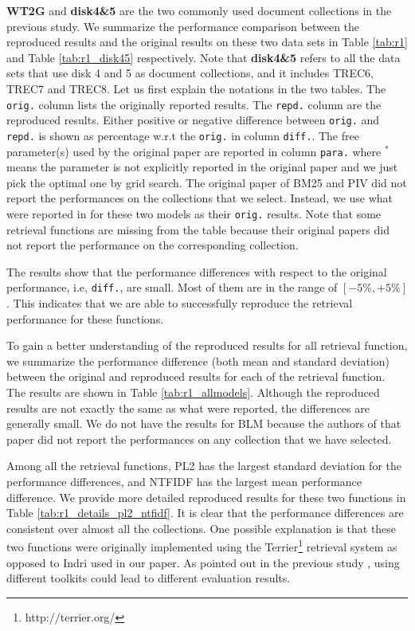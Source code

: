 \textbf{WT2G} and \textbf{disk4\&5} are the two commonly used document 
collections in the previous study.  We summarize the performance comparison 
between the reproduced results and the original results on these 
two data sets in Table \ref{tab:r1} and Table \ref{tab:r1_disk45} 
respectively. Note that \textbf{disk4\&5} refers to all the data sets 
that use disk 4 and 5 as document collections, and it includes 
TREC6, TREC7 and TREC8.  Let us first explain the notations in the 
two tables.  
The \verb|orig.| column lists the originally reported results. 
The \verb|repd.| column are the reproduced results. 
Either positive or negative difference between \verb|orig.| and 
\verb|repd.| is shown as percentage w.r.t the \verb|orig.| in column 
\verb|diff.|. 
The free parameter(s) used by the original paper are 
reported in column \verb|para.| where $^*$ means the parameter is not 
explicitly reported in the original paper and we just pick the optimal 
one by grid search. 
The original paper of BM25 and PIV did not report the performances 
on the collections that we select. Instead, we use what were 
reported in \cite{He:2005:SDP:1076034.1076114,Lv:2011:LTF:2063576.2063584} for 
these two models as their \verb|orig.| results.  Note that some retrieval 
functions are missing from the table because their original papers 
did not report the performance on the corresponding collection. 

The results show that the performance differences with respect to the 
original performance, i.e, 
\verb|diff.|, are small.  Most of them are in the range of $[-5\%, +5\%]$. 
This indicates that we are able to successfully reproduce the retrieval 
performance for these functions. 



To gain a better understanding of the reproduced results for 
all retrieval function, we summarize the performance difference
(both mean and standard deviation) between the original 
and reproduced results for each of the retrieval function. 
The results are shown in Table \ref{tab:r1_allmodels}.  
Although the reproduced results are not 
exactly the same as what were reported, the differences are 
generally small. 
We do not have the results for BLM because the authors of that paper 
did not report the performances on any collection that 
we have selected.  

Among all the retrieval functions, PL2 has the largest standard 
deviation for the performance differences, and NTFIDF has the 
largest mean performance difference. We provide more detailed
reproduced results for these two functions in Table \ref{tab:r1_details_pl2_ntfidf}. 
It is clear that the performance differences are consistent over
almost all the collections.  One possible explanation is that 
these two functions were originally implemented using the 
Terrier\footnote{http://terrier.org/} retrieval system as opposed to
Indri used in our paper.  As pointed out in the previous study 
\cite{Muhleisen:2014:ODG:2600428.2609460}, using different toolkits
could lead to different evaluation results.



